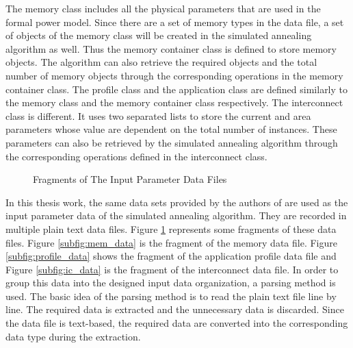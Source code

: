 	The memory class includes all the physical parameters that are used in the
	formal power model.  Since there are a set of memory types in the
	data file, a set of objects of the memory class will be created in
	the simulated annealing algorithm as well. Thus the memory container
	class is defined to store memory objects.
	The algorithm can also retrieve the required objects and the
	total number of memory objects through the corresponding operations
	in the memory container class.
	The profile class and the application class are defined similarly
	to the memory class and the memory container class respectively.
	The interconnect class is different. It uses two separated lists to store the
	current and area parameters whose value are dependent on the total
	number of instances. These parameters can also be retrieved by the
	simulated annealing algorithm through the corresponding operations
	defined in the interconnect class.
	\begin{figure}[h]
		\begin{center}
			\qquad
			\qquad
		\end{center}
		\caption{Fragments of The Input Parameter Data Files \cite{Strobel2016}}
		\label{fig;input_data}
	\end{figure}

	In this thesis work, the same data sets provided by the authors of \cite{Strobel2016}
	are used as the input parameter data of the simulated
	annealing algorithm. They are recorded in multiple
	plain text data files. Figure \ref{fig;input_data} represents some fragments
	of these data files. Figure \ref{subfig:mem_data} is the fragment of the
	memory data file. Figure \ref{subfig:profile_data} shows the fragment of the
	application profile data file and Figure \ref{subfig:ic_data} is the
	fragment of the interconnect data file. In order to group this data
	into the designed input data organization, a
	parsing method is used. The basic idea of the parsing method is to read the
	plain text file line by line. The required data is extracted and the
	unnecessary data is discarded. Since the data file is text-based,
	the required data are converted into the corresponding data type during the
	extraction.


